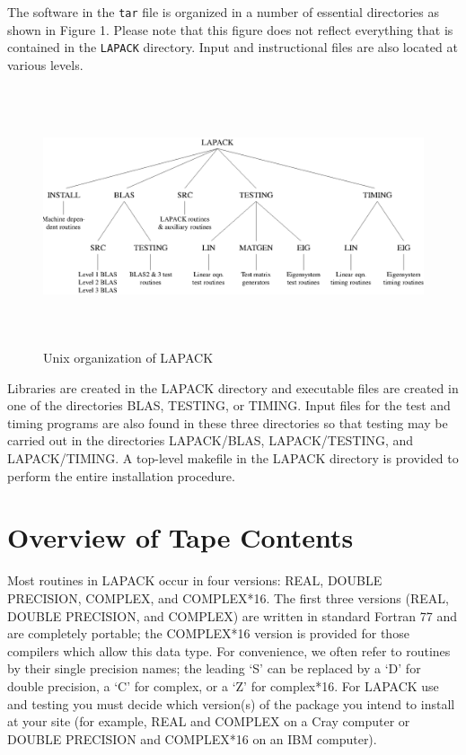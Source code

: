 \documentclass[11pt]{report}
\begin{document}
The software in the \texttt{tar} file
is organized in a number of essential directories as shown
in Figure 1.  Please note that this figure does not reflect everything
that is contained in the \texttt{LAPACK} directory.  Input and instructional
files are also located at various levels.
\begin{figure}
\vspace{11pt}
\centerline{\includegraphics[width=6.5in,height=3in]{org2.ps}}
\caption{Unix organization of LAPACK}
\vspace{11pt}
\end{figure}
Libraries are created in the LAPACK directory and 
executable files are created in one of the directories BLAS, TESTING,
or TIMING.  Input files for the test and timing programs are also
found in these three directories so that testing may be carried out
in the directories LAPACK/BLAS, LAPACK/TESTING, and LAPACK/TIMING.
A top-level makefile in the LAPACK directory is provided to perform the 
entire installation procedure.

\section{Overview of Tape Contents}\label{overview}

Most routines in LAPACK occur in four versions: REAL,
DOUBLE PRECISION, COMPLEX, and COMPLEX*16.
The first three versions (REAL, DOUBLE PRECISION, and COMPLEX)
are written in standard Fortran 77 and are completely portable;
the COMPLEX*16 version is provided for
those compilers which allow this data type.  
For convenience, we often refer to routines by their single precision
names; the leading `S' can be replaced by a `D' for double precision,
a `C' for complex, or a `Z' for complex*16.  
For LAPACK use and testing you must decide which version(s)
of the package you intend to install at your site (for example,
REAL and COMPLEX on a Cray computer or DOUBLE PRECISION and
COMPLEX*16 on an IBM computer).
\end{document}
